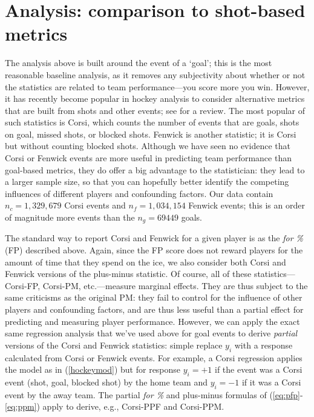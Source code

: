 \section{Analysis: comparison to shot-based metrics}
\label{sec:shots}


The analysis above is built around the event of a `goal'; this is the most
reasonable baseline analysis, as it removes any subjectivity about whether or
not the statistics are related to team performance---you score more you win.
However, it has recently become popular in hockey analysis to consider
alternative metrics that are built from shots and other events; see
\cite{vol10} for a review. The most popular of such statistics is Corsi, which
counts the number of events that are goals, shots on goal, missed shots, or
blocked shots.  Fenwick is another statistic; it is Corsi but without counting
blocked shots.  Although we have seen no evidence that Corsi or Fenwick events
are more useful in predicting team performance than goal-based metrics, they
do offer a big advantage to the statistician: they lead to a larger sample
size, so that you can hopefully better identify the competing influences of
different players and confounding factors. Our data contain
$n_{c}=1,329,679$ Corsi events and $n_{f}=1,034,154$ Fenwick events; this is
an order of magnitude more events than the $n_g=69449$ goals.

The standard way to report Corsi and Fenwick for a given player is as the
\textit{for \%} (FP) described above.  Again, since the FP score does not reward players for the
amount of time that they spend on the ice, we also consider both Corsi and
Fenwick versions of the plus-minus statistic. Of course, all of
these statistics---Corsi-FP, Corsi-PM, etc.---measure marginal effects.  They
are thus subject to the same criticisms as the original PM: they fail to
control for the influence of other players and confounding factors, and are
thus less useful than a partial effect for predicting and measuring player
performance.  However, we can apply the exact same regression analysis that
we've used above for goal events to derive
\textit{partial} versions of the Corsi and Fenwick statistics: simple replace
$y_i$ with a response calculated from Corsi or Fenwick events.  For example, a
Corsi regression applies the model as in (\ref{hockeymod}) but for response
$y_i=+1$ if the event was a Corsi event (shot, goal, blocked shot) by the home
team and $y_i=-1$ if it was a Corsi event by the away team. The partial \textit{for \%}
and plus-minus formulas of (\ref{eq:pfp}-\ref{eq:ppm}) apply to derive, e.g.,
Corsi-PPF and Corsi-PPM.

